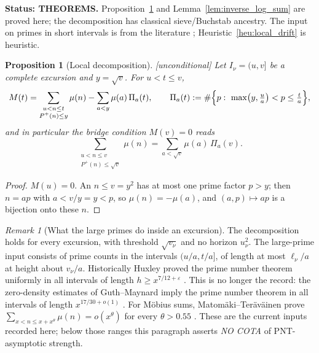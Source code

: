 \documentclass[11pt]{amsart}
\numberwithin{equation}{section}
\theoremstyle{plain}
\newtheorem{proposition}[theorem]{Proposition}
\theoremstyle{definition}
\theoremstyle{remark}
\newtheorem{remark}[theorem]{Remark}
\newcommand{\Pp}{P^{+}}
\begin{document}
\noindent\textbf{Status: THEOREMS.} Proposition~\ref{prop:local_large_prime}
and Lemma~\ref{lem:inverse_log_sum} are proved here; the decomposition has
classical sieve/Buchstab ancestry. The input on
primes in short intervals is from the literature \cite{Huxley1972};
Heuristic~\ref{heu:local_drift} is heuristic.

\begin{proposition}[Local decomposition]
\label{prop:local_large_prime}
\emph{[unconditional]} Let $I_\nu=(u,v]$ be a complete excursion and
$y=\sqrt v$. For $u<t\le v$,
\begin{equation}
\label{eq:local_split}
  M(t)=\sum_{\substack{u<n\le t\\ \Pp(n)\le y}}\mu(n)
  -\sum_{a<y}\mu(a)\,\Pi_a(t),\qquad
  \Pi_a(t):=\#\Bigl\{p:\ \max\bigl(y,\tfrac ua\bigr)<p\le\tfrac ta\Bigr\},
\end{equation}
and in particular the bridge condition $M(v)=0$ reads
\begin{equation}
\label{eq:local_bridge}
  \sum_{\substack{u<n\le v\\ \Pp(n)\le\sqrt v}}\mu(n)
  =\sum_{a<\sqrt v}\mu(a)\,\Pi_a(v).
\end{equation}
\end{proposition}

\begin{proof}
$M(u)=0$. An $n\le v=y^2$ has at most one prime factor $p>y$; then
$n=ap$ with $a<v/y=y<p$, so $\mu(n)=-\mu(a)$, and $(a,p)\mapsto ap$ is a
bijection onto these $n$.
\end{proof}

\begin{remark}[What the large primes do inside an excursion]
\label{rem:local_meaning}
The decomposition holds for every excursion, with threshold $\sqrt{v_\nu}$
and no horizon $u_\nu^2$. The large-prime input consists of prime counts in
the intervals $(u/a,t/a]$, of length at most $\ell_\nu/a$ at height about
$v_\nu/a$. Historically Huxley proved the prime number theorem uniformly in all
intervals of length $h\ge x^{7/12+\varepsilon}$ \cite{Huxley1972}. This is
no longer the record: the zero-density estimates of Guth--Maynard imply the
prime number theorem in all intervals of length $x^{17/30+o(1)}$
\cite{GuthMaynard2024}. For M\"obius sums, Matom\"aki--Ter\"av\"ainen prove
$\sum_{x<n\le x+x^\theta}\mu(n)=o(x^\theta)$ for every
$\theta>0.55$ \cite{MatomakiTeravainen2023}. These are the current inputs
recorded here; below those ranges this paragraph asserts \emph{NO COTA} of
PNT-asymptotic strength.
\end{remark}
\end{document}
